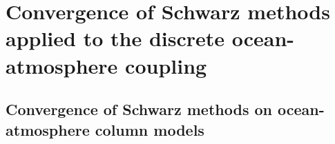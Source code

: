 \chapter{Convergence of Schwarz methods applied to the
discrete ocean-atmosphere coupling}
\label{ch:OASchwarz}
\minitoc

\section{Convergence of Schwarz methods on ocean-atmosphere column models}
\begin{subappendices}


\end{subappendices}
